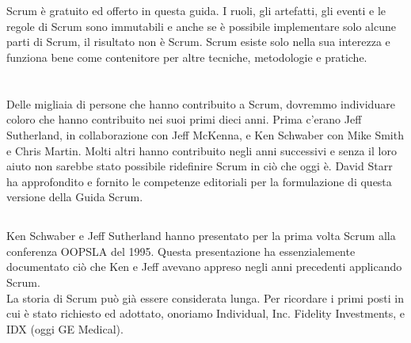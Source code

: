 
\section*{\color{Blue}{Conclusioni}}%
\label{sec:conclusion}
Scrum è gratuito ed offerto in questa guida. I ruoli, gli artefatti, gli eventi e le regole di Scrum sono immutabili e anche se \`e 
possibile implementare solo alcune parti di Scrum, il risultato non \`e Scrum. Scrum esiste solo nella sua interezza e funziona bene come 
contenitore per altre tecniche, metodologie e pratiche.

\section*{\color{Blue}{Ringraziamenti}}%
\label{sec:acknowledgements}

\subsection*{\color{SteelBlue}{Persone}}%
\label{sec:people}
Delle migliaia di persone che hanno contribuito a Scrum, dovremmo individuare coloro che hanno contribuito nei suoi
primi dieci anni. Prima c'erano Jeff Sutherland, in collaborazione con Jeff McKenna, e Ken Schwaber con Mike Smith e
Chris Martin. Molti altri hanno contribuito negli anni successivi e senza il loro aiuto non sarebbe stato possibile ridefinire Scrum in 
ci\`o che oggi \`e. David Starr ha approfondito e fornito le competenze editoriali per la formulazione di questa versione della Guida Scrum.

\subsection*{\color{SteelBlue}{Storia}}%
\label{sec:history}
Ken Schwaber e Jeff Sutherland hanno presentato per la prima volta Scrum alla conferenza OOPSLA del 1995. Questa presentazione ha 
essenzialemente documentato ci\`o che Ken e Jeff avevano appreso negli anni precedenti applicando Scrum.
\newline
\\La storia di Scrum pu\`o gi\`a essere considerata lunga. Per ricordare i primi posti in cui \`e stato richiesto ed adottato, onoriamo 
Individual, Inc. Fidelity Investments, e IDX (oggi GE Medical).

